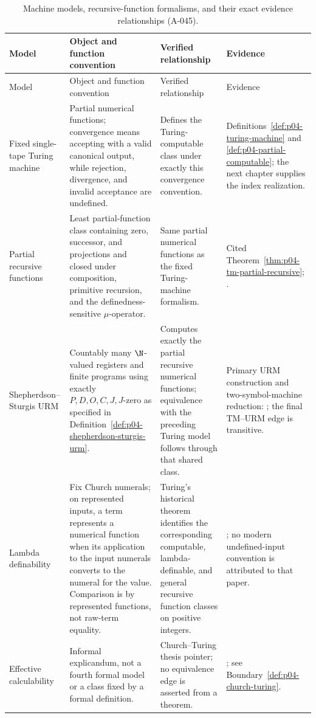 \begin{landscape}
\begingroup\small\setlength{\tabcolsep}{3pt}
\begin{longtable}{@{}p{1.10in}p{2.25in}p{1.85in}p{1.84in}@{}}
\caption{Machine models, recursive-function formalisms, and their exact
evidence relationships (A-045).}
\label{tab:p04-machine-equivalences}\\
\toprule
Model & Object and function convention & Verified relationship & Evidence \\
\midrule
\endfirsthead
\toprule
Model & Object and function convention & Verified relationship & Evidence \\
\midrule
\endhead
Fixed single-tape Turing machine & Partial numerical functions; convergence
means accepting with a valid canonical output, while rejection, divergence,
and invalid acceptance are undefined. & Defines the Turing-computable class
under exactly this convergence convention. &
Definitions~\ref{def:p04-turing-machine} and
\ref{def:p04-partial-computable}; the next chapter supplies the index
realization. \\
\addlinespace
Partial recursive functions & Least partial-function class containing zero,
successor, and projections and closed under composition, primitive recursion,
and the definedness-sensitive \(\mu\)-operator. & Same partial numerical
functions as the fixed Turing-machine formalism. & Cited
Theorem~\ref{thm:p04-tm-partial-recursive};
\cite{Kleene1936,Kleene1952,Turing1937Lambda}. \\
\addlinespace
Shepherdson--Sturgis URM & Countably many \(\N\)-valued registers and finite
programs using exactly \(P,D,O,C,J,J\)-zero as specified in
Definition~\ref{def:p04-shepherdson-sturgis-urm}. & Computes exactly the
partial recursive numerical functions; equivalence with the preceding Turing
model follows through that shared class. & Primary URM construction and
two-symbol-machine reduction: \cite{ShepherdsonSturgis1963}; the final
TM--URM edge is transitive. \\
\addlinespace
Lambda definability & Fix Church numerals; on represented inputs, a term
represents a numerical function when its application to the input numerals
converts to the numeral for the value.  Comparison is by represented
functions, not raw-term equality. & Turing's historical theorem identifies the
corresponding computable, lambda-definable, and general recursive function
classes on positive integers. & \cite{Turing1937Lambda}; no modern
undefined-input convention is attributed to that paper. \\
\addlinespace
Effective calculability & Informal explicandum, not a fourth formal model or a
class fixed by a formal definition. & Church--Turing thesis pointer; no
equivalence edge is asserted from a theorem. &
\cite{Church1936,Turing1937Lambda,Soare1996ComputabilityRecursion}; see
Boundary~\ref{def:p04-church-turing}. \\
\bottomrule
\end{longtable}
\endgroup
\end{landscape}

